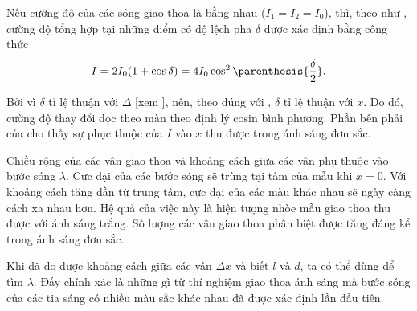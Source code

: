 Nếu cường độ của các sóng giao thoa là bằng nhau ($I_1=I_2=I_0$), thì, theo như , cường độ tổng hợp tại những điểm có độ lệch pha $\delta$ được xác định bằng công thức
\begin{equation*}
    I = 2 I_0 (1 + \cos\delta) = 4 I_0 \cos^2\parenthesis{\frac{\delta}{2}}.
\end{equation*}

\noindent
Bởi vì $\delta$ tỉ lệ thuận với $\Delta$ [xem ], nên, theo đúng với , $\delta$ tỉ lệ thuận với $x$.
Do đó, cường độ thay đổi dọc theo màn theo định lý cosin bình phương.
Phần bên phải của  cho thấy sự phục thuộc của $I$ vào $x$ thu được trong ánh sáng đơn sắc.

Chiều rộng của các vân giao thoa và khoảng cách giữa các vân phụ thuộc vào bước sóng $\lambda$.
Cực đại của các bước sóng sẽ trùng tại tâm của mẫu khi $x=0$.
Với khoảng cách tăng dần từ trung tâm, cực đại của các màu khác nhau sẽ ngày càng cách xa nhau hơn.
Hệ quả của việc này là hiện tượng nhòe mẫu giao thoa thu được với ánh sáng trắng.
Số lượng các vân giao thoa phân biệt được tăng đáng kể trong ánh sáng đơn sắc.

Khi đã đo được khoảng cách giữa các vân $\Delta{x}$ và biết $l$ và $d$, ta có thể dùng  để tìm $\lambda$.
Đấy chính xác là những gì từ thí nghiệm giao thoa ánh sáng mà bước sóng của các tia sáng có nhiều màu sắc khác nhau đã được xác định lần đầu tiên.

